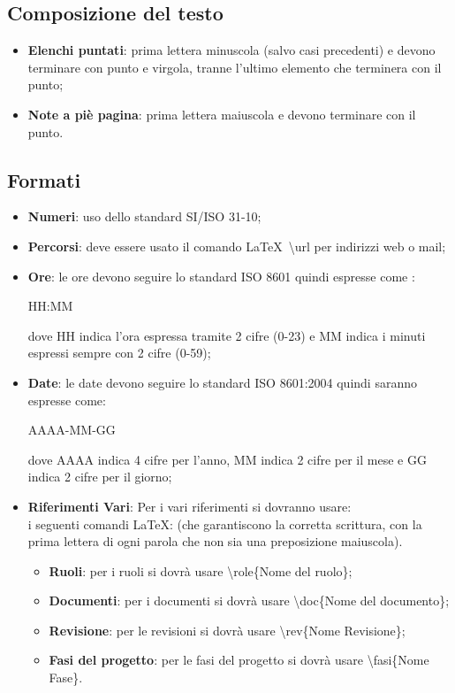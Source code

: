 \documentclass[a4paper]{report}
\begin{document}
	\subsection{Composizione del testo}
	\begin{itemize}
		\item \textbf{Elenchi puntati}: prima lettera minuscola (salvo casi precedenti) e devono terminare con punto e virgola, tranne l'ultimo elemento che terminera con il punto;
		\item \textbf{Note a piè pagina}: prima lettera maiuscola e devono terminare con il punto.
	\end{itemize}
	\subsection{Formati}
	\begin{itemize}
		\item \textbf{Numeri}: uso dello standard SI/ISO 31-10; 
		\item \textbf{Percorsi}: deve essere usato il comando \LaTeX\ \textbackslash url per indirizzi web  o mail;
		\item \textbf{Ore}: le ore devono seguire lo standard ISO 8601 quindi espresse come :\\
		\begin{center}
			HH:MM 
		\end{center}  
		dove HH indica l'ora espressa tramite 2 cifre (0-23) e MM indica i minuti espressi sempre con 2 cifre (0-59);
		\item \textbf{Date}: le date devono seguire lo standard ISO 8601:2004 quindi saranno espresse come:
		\begin{center}
			AAAA-MM-GG
		\end{center}  
		dove AAAA indica 4 cifre per l'anno, MM indica 2 cifre per il mese e GG indica 2 cifre per il giorno;
		
		\item \textbf{Riferimenti Vari}: Per i vari riferimenti si dovranno usare:\\  i seguenti comandi \LaTeX: (che garantiscono la corretta scrittura, con la prima lettera di ogni parola che non sia una preposizione maiuscola).
		\begin{itemize}
			\item \textbf{Ruoli}: per i ruoli si dovrà usare \textbackslash role\{Nome del ruolo\};
			\item \textbf{Documenti}: per i documenti si dovrà usare \textbackslash doc\{Nome del documento\};
			\item \textbf{Revisione}: per le revisioni si dovrà usare \textbackslash rev\{Nome Revisione\};
			\item \textbf{Fasi del progetto}: per le fasi del progetto si dovrà usare \textbackslash fasi\{Nome Fase\}.
		\end{itemize}
	\end{itemize}
\end{document}
